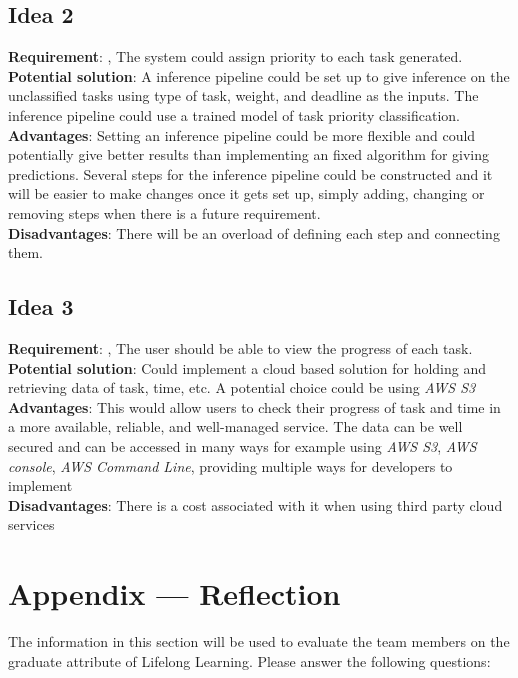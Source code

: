 \documentclass[12pt]{article}
\begin{document}
\subsection{Idea 2}
\textbf{Requirement}: , The system could assign priority to each task generated. \\
\textbf{Potential solution}: A inference pipeline could be set up to give inference on the unclassified tasks using type of task, weight, and deadline as the inputs. The inference pipeline could use a trained model of task priority classification.\\
\textbf{Advantages}: Setting an inference pipeline could be more flexible and could potentially give better results than implementing an fixed algorithm for giving predictions. Several steps for the inference pipeline could be constructed and it will be easier to make changes once it gets set up, simply adding, changing or removing steps when there is a future requirement.\\
\textbf{Disadvantages}: There will be an overload of defining each step and connecting them. \\

\subsection{Idea 3}
\textbf{Requirement}: , The user should be able to view the progress of each task. \\
\textbf{Potential solution}: Could implement a cloud based solution for holding and retrieving data of task, time, etc. A potential choice could be using \textit{AWS S3}\\
\textbf{Advantages}: This would allow users to check their progress of task and time in a more available, reliable, and well-managed service. The data can be well secured and can be accessed in many ways for example using \textit{AWS S3}, \textit{AWS console}, \textit{AWS Command Line}, providing multiple ways for developers to implement  \\
\textbf{Disadvantages}: There is a cost associated with it when using third party cloud services
\newpage{}
\section*{Appendix --- Reflection}

The information in this section will be used to evaluate the team members on the
graduate attribute of Lifelong Learning.  Please answer the following questions:
\end{document}
